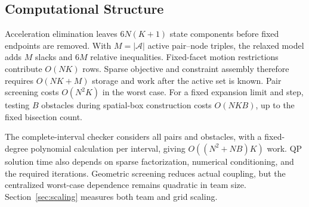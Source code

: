 \subsection{Computational Structure}
Acceleration elimination leaves $6N(K+1)$ state components before fixed endpoints are removed. With $M=|\mathcal A|$ active pair--node triples, the relaxed model adds $M$ slacks and $6M$ relative inequalities. Fixed-facet motion restrictions contribute $O(NK)$ rows. Sparse objective and constraint assembly therefore requires $O(NK+M)$ storage and work after the active set is known. Pair screening costs $O(N^2K)$ in the worst case. For a fixed expansion limit and step, testing $B$ obstacles during spatial-box construction costs $O(NKB)$, up to the fixed bisection count.

The complete-interval checker considers all pairs and obstacles, with a fixed-degree polynomial calculation per interval, giving $O((N^2+NB)K)$ work. QP solution time also depends on sparse factorization, numerical conditioning, and the required iterations. Geometric screening reduces actual coupling, but the centralized worst-case dependence remains quadratic in team size. Section~\ref{sec:scaling} measures both team and grid scaling.
